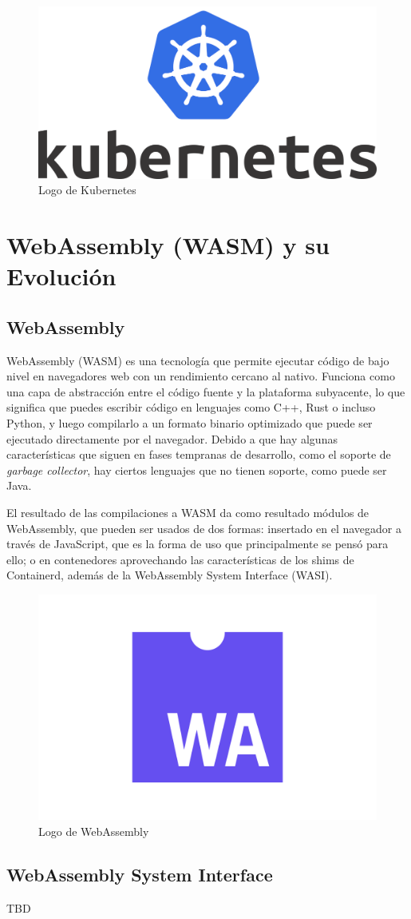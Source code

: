 \begin{figure}[h!]
    \centering
    \includegraphics[width=0.5\linewidth]{figures/kubernetes-logo.png}
    \caption{Logo de Kubernetes}
    \label{fig:kubernetes-logo}
\end{figure}

\section{WebAssembly (WASM) y su Evolución}

\subsection{WebAssembly}

WebAssembly (WASM) es una tecnología que permite ejecutar código de bajo nivel en navegadores web con un rendimiento cercano al nativo. Funciona como una capa de abstracción entre el código fuente y la plataforma subyacente, lo que significa que puedes escribir código en lenguajes como C++, Rust o incluso Python, y luego compilarlo a un formato binario optimizado que puede ser ejecutado directamente por el navegador. Debido a que hay algunas características que siguen en fases tempranas de desarrollo, como el soporte de \textit{garbage collector}, hay ciertos lenguajes que no tienen soporte, como puede ser Java.

El resultado de las compilaciones a WASM da como resultado módulos de WebAssembly, que pueden ser usados de dos formas: insertado en el navegador a través de JavaScript, que es la forma de uso que principalmente se pensó para ello; o en contenedores aprovechando las características de los shims de Containerd, además de la WebAssembly System Interface (WASI).

\begin{figure}[h!]
    \centering
    \includegraphics[width=0.75\linewidth]{figures/WebAssembly-Logo.png}
    \caption{Logo de WebAssembly}
    \label{fig:WebAssembly-Logo}
\end{figure}

\subsection{WebAssembly System Interface}

TBD